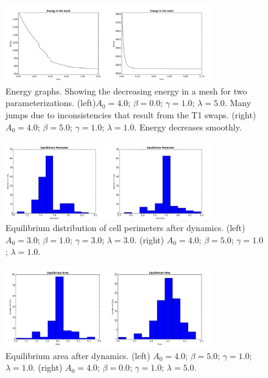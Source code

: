 \begin{figure}
\centering
\includegraphics[width=0.8\textwidth]{../diagrams/energyComp.png}
\caption[Energy graphs.]{Energy graphs. Showing the decreasing energy in a mesh for two parameterizations. (left)$A_0 = 4.0$; $\beta = 0.0$; $\gamma = 1.0$; $\lambda = 5.0$. Many jumps due to inconsistencies that result from the T1 swaps. (right) $A_0 = 4.0$; $\beta = 5.0$; $\gamma = 1.0$; $\lambda = 1.0$. Energy decreases smoothly.}
\label{fig:g1}
\end{figure}

\begin{figure}
\centering
\includegraphics[width=0.8\textwidth]{../diagrams/perimComp.png}
\caption[Equilibrium area graphs]{Equilibrium distribution of cell perimeters after dynamics. (left) $A_0 = 3.0$; $\beta = 1.0$; $\gamma = 3.0$; $\lambda = 3.0$. (right) $A_0 = 4.0$; $\beta = 5.0$; $\gamma = 1.0$; $\lambda = 1.0$.}
\label{fig:g2}
\end{figure}

\begin{figure}
\centering
\includegraphics[width=0.8\textwidth]{../diagrams/areaComp.png}
\caption[Equilibrium area graphs]{Equilibrium area after dynamics. (left) $A_0 = 4.0$; $\beta = 5.0$; $\gamma = 1.0$; $\lambda = 1.0$. (right) $A_0 = 4.0$; $\beta = 0.0$; $\gamma = 1.0$; $\lambda = 5.0$.}
\label{fig:g3}
\end{figure}

